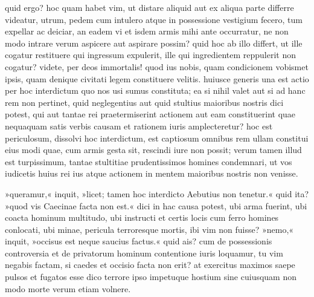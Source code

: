 quid ergo? hoc quam habet vim, ut distare aliquid aut ex aliqua parte differre videatur, utrum, pedem cum intulero atque in possessione vestigium fecero, tum expellar ac deiciar, an eadem vi et isdem armis mihi ante occurratur, ne non modo intrare verum aspicere aut aspirare possim? quid hoc ab illo differt, ut ille cogatur restituere qui ingressum expulerit, ille qui ingredientem reppulerit non cogatur?
 videte, per deos immortalis! quod ius nobis, quam condicionem vobismet ipsis, quam denique civitati legem constituere velitis. huiusce generis una est actio per hoc interdictum quo nos usi sumus constituta; ea si nihil valet aut si ad hanc rem non pertinet, quid neglegentius aut quid stultius maioribus nostris dici potest, qui aut tantae rei praetermiserint actionem aut eam constituerint quae nequaquam satis verbis causam et rationem iuris amplecteretur? hoc est periculosum, dissolvi hoc interdictum, est captiosum omnibus rem ullam constitui eius modi quae, cum armis gesta sit, rescindi iure non possit; verum tamen illud est turpissimum, tantae stultitiae prudentissimos homines condemnari, ut vos iudicetis huius rei ius atque actionem in mentem maioribus nostris non venisse.

 »queramur,« inquit, »licet; tamen hoc interdicto Aebutius non tenetur.« quid ita? »quod vis Caecinae facta non est.« dici in hac causa potest, ubi arma fuerint, ubi coacta hominum multitudo, ubi instructi et certis locis cum ferro homines conlocati, ubi minae, pericula terroresque mortis, ibi vim non fuisse? »nemo,« inquit, »occisus est neque saucius factus.« quid ais? cum de possessionis controversia et de privatorum hominum contentione iuris loquamur, tu vim negabis factam, si caedes et occisio facta non erit? at exercitus maximos saepe pulsos et fugatos esse dico terrore ipso impetuque hostium sine cuiusquam non modo morte verum etiam volnere.
